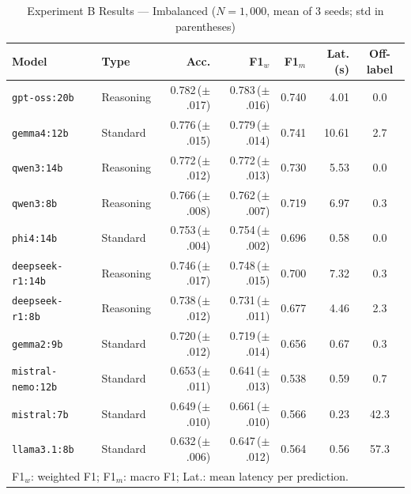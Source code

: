 \documentclass[10pt,a4paper,twocolumn]{article}
\begin{document}
\begin{table}[!t]
  \renewcommand{\arraystretch}{1.2}
  \caption{Experiment B Results --- Imbalanced ($N = 1{,}000$, mean of 3 seeds; std in parentheses)}
  \label{tab:results_imbalanced}
  \centering
  \footnotesize
  \setlength{\tabcolsep}{4pt}
  \begin{tabular}{@{}llrrrrc@{}}
    \toprule
    \textbf{Model} & \textbf{Type} & \textbf{Acc.} & \textbf{F1$_w$} & \textbf{F1$_m$} & \textbf{Lat.(s)} & \textbf{Off-label} \\
    \midrule
    \texttt{gpt-oss:20b}      & Reasoning & 0.782\,({\footnotesize$\pm$.017}) & 0.783\,({\footnotesize$\pm$.016}) & 0.740 &  4.01 & 0.0 \\
    \texttt{gemma4:12b}       & Standard  & 0.776\,({\footnotesize$\pm$.015}) & 0.779\,({\footnotesize$\pm$.014}) & 0.741 & 10.61 & 2.7 \\
    \texttt{qwen3:14b}        & Reasoning & 0.772\,({\footnotesize$\pm$.012}) & 0.772\,({\footnotesize$\pm$.013}) & 0.730 &  5.53 & 0.0 \\
    \texttt{qwen3:8b}         & Reasoning & 0.766\,({\footnotesize$\pm$.008}) & 0.762\,({\footnotesize$\pm$.007}) & 0.719 &  6.97 & 0.3 \\
    \texttt{phi4:14b}         & Standard  & 0.753\,({\footnotesize$\pm$.004}) & 0.754\,({\footnotesize$\pm$.002}) & 0.696 &  0.58 & 0.0 \\
    \texttt{deepseek-r1:14b}  & Reasoning & 0.746\,({\footnotesize$\pm$.017}) & 0.748\,({\footnotesize$\pm$.015}) & 0.700 &  7.32 & 0.3 \\
    \texttt{deepseek-r1:8b}   & Reasoning & 0.738\,({\footnotesize$\pm$.012}) & 0.731\,({\footnotesize$\pm$.011}) & 0.677 &  4.46 & 2.3 \\
    \texttt{gemma2:9b}        & Standard  & 0.720\,({\footnotesize$\pm$.012}) & 0.719\,({\footnotesize$\pm$.014}) & 0.656 &  0.67 & 0.3 \\
    \texttt{mistral-nemo:12b} & Standard  & 0.653\,({\footnotesize$\pm$.011}) & 0.641\,({\footnotesize$\pm$.013}) & 0.538 &  0.59 & 0.7 \\
    \texttt{mistral:7b}       & Standard  & 0.649\,({\footnotesize$\pm$.010}) & 0.661\,({\footnotesize$\pm$.010}) & 0.566 &  0.23 & 42.3 \\
    \texttt{llama3.1:8b}      & Standard  & 0.632\,({\footnotesize$\pm$.006}) & 0.647\,({\footnotesize$\pm$.012}) & 0.564 &  0.56 & 57.3 \\
    \bottomrule
    \multicolumn{7}{l}{\footnotesize F1$_w$: weighted F1; F1$_m$: macro F1; Lat.: mean latency per prediction.}
  \end{tabular}
\end{table}
\end{document}
